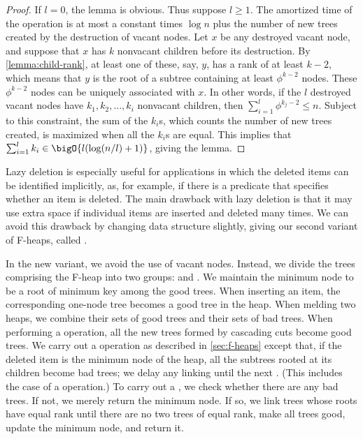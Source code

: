 \begin{proof}
    If \(l = 0\), the lemma is obvious. Thus suppose \(l \geq 1\). The amortized time
    of the  operation is at most a constant times \(\log n\) plus the
    number of new trees created by the destruction of vacant nodes. Let \(x\) be any
    destroyed vacant node, and suppose that \(x\) has \(k\) nonvacant children before
    its destruction. By \autoref{lemma:child-rank}, at least one of these, say,
    \(y\), has a rank of at least \(k - 2\), which means that \(y\) is the root of
    a subtree containing at least \(\phi^{k-2}\) nodes. These \(\phi^{k-2}\) nodes
    can be uniquely associated with \(x\). In other words, if the \(l\) destroyed
    vacant nodes have \(k_1, k_2, \dots, k_i\) nonvacant children, then
    \(\sum_{i=1}^l \phi^{k_j-2} \leq n\). Subject to this constraint, the sum of the
    \(k_i\)s, which counts the number of new trees created, is maximized when all the
    \(k_i\)s are equal. This implies that \(\sum_{i=1}^l k_i \in \bigO{l (\log(n/l)
    + 1)}\), giving the lemma.
\end{proof}

Lazy deletion is especially useful for applications in which the deleted items can be
identified implicitly, as, for example, if there is a predicate that specifies
whether an item is deleted. The main drawback with lazy deletion is that it may use
extra space if individual items are inserted and deleted many times. We can avoid
this drawback by changing data structure slightly, giving our second variant of
F-heaps, called .

In the new variant, we avoid the use of vacant nodes. Instead, we divide the trees
comprising the F-heap into two groups:  and . We
maintain the minimum node to be a root of minimum key among the good trees. When
inserting an item, the corresponding one-node tree becomes a good tree in the heap.
When melding two heaps, we combine their sets of good trees and their sets of bad
trees. When performing a  operation, all the new trees formed by
cascading cuts become good trees. We carry out a  operation as described
in \autoref{sec:f-heaps} except that, if the deleted item is the minimum node of the
heap, all the subtrees rooted at its children become bad trees; we delay any linking
until the next . (This includes the case of a 
operation.) To carry out a , we check whether there are any bad trees.
If not, we merely return the minimum node. If so, we link trees whose roots have
equal rank until there are no two trees of equal rank, make all trees good, update
the minimum node, and return it.


